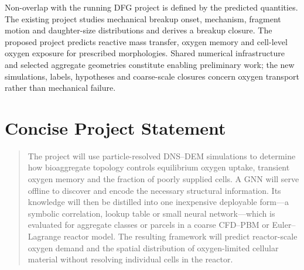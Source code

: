 \documentclass[11pt,a4paper]{article}
\begin{document}
Non-overlap with the running DFG project is defined by the predicted
quantities. The existing project studies mechanical breakup onset, mechanism,
fragment motion and daughter-size distributions and derives a breakup closure.
The proposed project predicts reactive mass transfer, oxygen memory and
cell-level oxygen exposure for prescribed morphologies. Shared numerical
infrastructure and selected aggregate geometries constitute enabling
preliminary work; the new simulations, labels, hypotheses and coarse-scale
closures concern oxygen transport rather than mechanical failure.

\section{Concise Project Statement}

\begin{quote}
The project will use particle-resolved DNS--DEM simulations to determine how
bioaggregate topology controls equilibrium oxygen uptake, transient oxygen
memory and the fraction of poorly supplied cells. A GNN will serve offline to
discover and encode the necessary structural information. Its knowledge will
then be distilled into one inexpensive deployable form---a symbolic
correlation, lookup table or small neural network---which is evaluated for
aggregate classes or parcels in a coarse CFD--PBM or Euler--Lagrange reactor
model. The resulting framework will predict reactor-scale oxygen demand and
the spatial distribution of oxygen-limited cellular material without resolving
individual cells in the reactor.
\end{quote}


\end{document}
